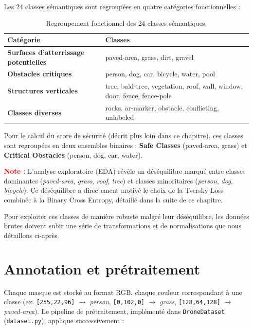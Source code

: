 Les 24 classes sémantiques sont regroupées en quatre catégories fonctionnelles :

\begin{table}[!hb]
  \centering
  \caption{Regroupement fonctionnel des 24 classes sémantiques.}
  \label{tab:classes}
  \renewcommand{\arraystretch}{1.4}
  \begin{tabularx}{0.95\textwidth}{
    >{\bfseries\color{ENIADBlue}}l
    >{\arraybackslash}X
  }
    \toprule
    \rowcolor{ENIADBlue!12}
    \textbf{Catégorie} & \textbf{Classes} \\
    \midrule
    Surfaces d'atterrissage potentielles & paved-area, grass, dirt, gravel \\
    \rowcolor{ENIADLightBlue!20}
    Obstacles critiques & person, dog, car, bicycle, water, pool \\
    Structures verticales & tree, bald-tree, vegetation, roof, wall, window, door, fence, fence-pole \\
    \rowcolor{ENIADLightBlue!20}
    Classes diverses & rocks, ar-marker, obstacle, conflicting, unlabeled \\
    \bottomrule
  \end{tabularx}
\end{table}

Pour le calcul du score de sécurité (décrit plus loin dans ce chapitre), ces classes sont regroupées en deux ensembles binaires : \textbf{Safe Classes} (paved-area, grass) et \textbf{Critical Obstacles} (person, dog, car, water).

\textbf{\textcolor{red}{Note :}} L'analyse exploratoire (EDA) révèle un déséquilibre marqué entre classes dominantes (\textit{paved-area}, \textit{grass}, \textit{roof}, \textit{tree}) et classes minoritaires (\textit{person}, \textit{dog}, \textit{bicycle}). Ce déséquilibre a directement motivé le choix de la Tversky Loss combinée à la Binary Cross Entropy, détaillé dans la suite de ce chapitre.

Pour exploiter ces classes de manière robuste malgré leur déséquilibre, les données brutes doivent subir une série de transformations et de normalisations que nous détaillons ci-après.

\section{Annotation et prétraitement}
\label{sec:pretraitement}

Chaque masque est stocké au format RGB, chaque couleur correspondant à une classe (ex. \texttt{[255,22,96]} $\rightarrow$ \textit{person}, \texttt{[0,102,0]} $\rightarrow$ \textit{grass}, \texttt{[128,64,128]} $\rightarrow$ \textit{paved-area}). Le pipeline de prétraitement, implémenté dans \texttt{DroneDataset} (\texttt{dataset.py}), applique successivement :

